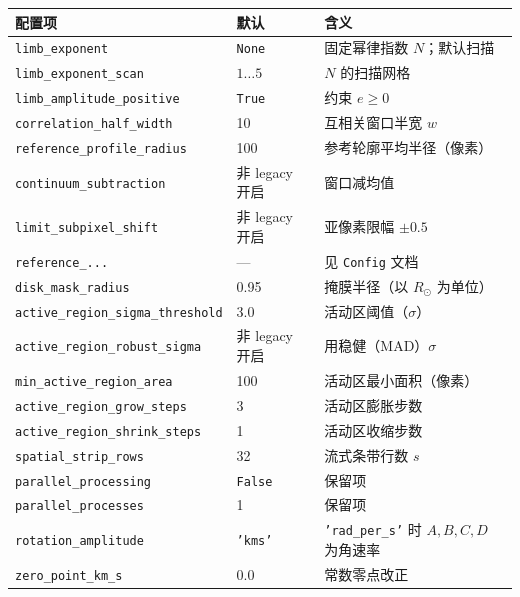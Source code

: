 \documentclass[11pt,a4paper]{ctexart}
\newcommand{\code}[1]{\texttt{\small #1}}
\newcommand{\Rsun}{R_{\odot}}
\begin{document}
\begin{longtable}{@{}lll@{}}
\toprule
配置项 & 默认 & 含义 \\
\midrule
\endhead
\code{limb\_exponent}             & \code{None} & 固定幂律指数 $N$；默认扫描 \\
\code{limb\_exponent\_scan}       & $1\ldots5$  & $N$ 的扫描网格 \\
\code{limb\_amplitude\_positive}  & \code{True} & 约束 $e\ge0$ \\
\code{correlation\_half\_width}   & 10 & 互相关窗口半宽 $w$ \\
\code{reference\_profile\_radius} & 100 & 参考轮廓平均半径（像素） \\
\code{continuum\_subtraction}     & 非 legacy 开启 & 窗口减均值 \\
\code{limit\_subpixel\_shift}     & 非 legacy 开启 & 亚像素限幅 $\pm0.5$ \\
\code{reference\_...}             & --- & 见 \code{Config} 文档 \\
\code{disk\_mask\_radius}         & 0.95 & 掩膜半径（以 $\Rsun$ 为单位） \\
\code{active\_region\_sigma\_threshold} & 3.0 & 活动区阈值（$\sigma$） \\
\code{active\_region\_robust\_sigma}    & 非 legacy 开启 & 用稳健（MAD）$\sigma$ \\
\code{min\_active\_region\_area}  & 100 & 活动区最小面积（像素） \\
\code{active\_region\_grow\_steps}   & 3 & 活动区膨胀步数 \\
\code{active\_region\_shrink\_steps} & 1 & 活动区收缩步数 \\
\code{spatial\_strip\_rows}       & 32 & 流式条带行数 $s$ \\
\code{parallel\_processing}       & \code{False} & 保留项 \\
\code{parallel\_processes}        & 1 & 保留项 \\
\code{rotation\_amplitude}        & \code{'kms'} & \code{'rad\_per\_s'} 时 $A,B,C,D$ 为角速率 \\
\code{zero\_point\_km\_s}         & 0.0 & 常数零点改正 \\
\bottomrule
\end{longtable}
\end{document}
